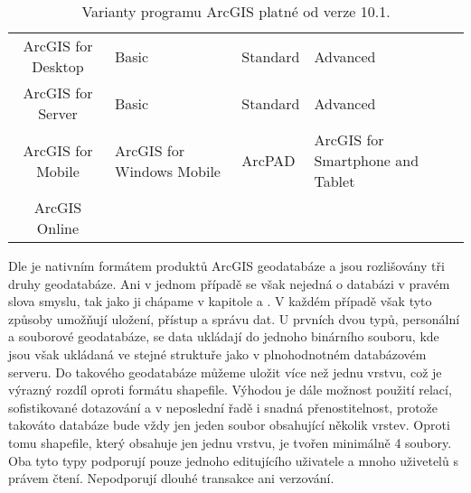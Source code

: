         \begin{table}[H]
          \caption{Varianty programu ArcGIS platné od verze 10.1.}
          \label{verzeArcGIS}
          \begin{footnotesize}
            \begin{center}
              \begin{tabular}{|>{\centering} c |>{\centering}m{9.5em}  m{8.5em}  <{\centering} m{11em}  <{\centering}|}
                \hline
                {\bf \color{purpurova7}Produkt}	& \multicolumn{3}{c|}{\bf \color{purpurova7}Verze} \\
                \hline
                ArcGIS for Desktop & Basic & Standard & Advanced \\
                 ArcGIS for Server &	Basic &	Standard &	Advanced \\
                 ArcGIS for Mobile &	ArcGIS for Windows Mobile &	ArcPAD &	ArcGIS for Smartphone and Tablet \\
                   ArcGIS Online   & & &	\\	
                \hline
              \end{tabular}
            \end{center}
          \end{footnotesize}
        \end{table}

        Dle \cite{Law2008} je nativním formátem produktů ArcGIS geodatabáze a
        jsou rozlišovány tři druhy geodatabáze. Ani v jednom případě se však
        nejedná o databázi v pravém slova smyslu, tak jako ji chápame v
        kapitole  a . V každém případě však tyto způsoby umožňují
        uložení, přístup a správu dat. U prvních dvou typů, personální a
        souborové geodatabáze, se data ukládají do jednoho binárního souboru,
        kde jsou však ukládaná ve stejné struktuře jako v plnohodnotném
        databázovém serveru. Do takového geodatabáze můžeme uložit více než
        jednu vrstvu, což je výrazný rozdíl oproti formátu shapefile. Výhodou
        je dále možnost použití relací, sofistikované dotazování a v neposlední
        řadě i snadná přenostitelnost, protože takováto databáze bude vždy jen
        jeden soubor obsahující několik vrstev. Oproti tomu shapefile, který
        obsahuje jen jednu vrstvu, je tvořen minimálně 4 soubory. Oba tyto typy
        podporují pouze jednoho editujícího uživatele a mnoho uživetelů s
        právem čtení. Nepodporují dlouhé transakce ani verzování. 


